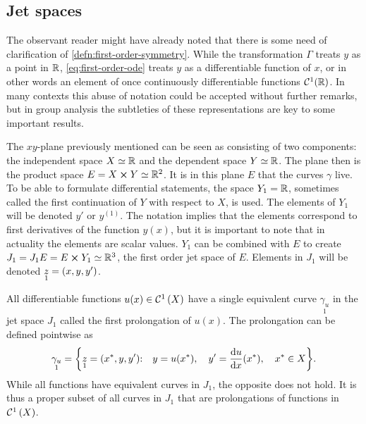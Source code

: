 \subsection{Jet spaces} \label{sec:jet-spaces}

The observant reader might have already noted that there is some need of clarification of \cref{defn:first-order-symmetry}.
While the transformation \(\Gamma\) treats \(y\) as a point in \(\mathbb{R}\), \cref{eq:first-order-ode} treats \(y\) as a differentiable function of \(x\), or in other words an element of once continuously differentiable functions \(\mathcal{C}^1(\mathbb{R})\).
In many contexts this abuse of notation could be accepted without further remarks, but in group analysis the subtleties of these representations are key to some important results.

The \(xy\)-plane previously mentioned can be seen as consisting of two components: the independent space \(X \simeq \mathbb{R}\) and the dependent space \(Y \simeq \mathbb{R}\).
The plane then is the product space \(E = X \cross Y \simeq \mathbb{R}^2\).
It is in this plane \(E\) that the curves \(\gamma\) live.
To be able to formulate differential statements, the space \(Y_1 = \mathbb{R}\), sometimes called the first continuation of \(Y\) with respect to \(X\), is used.
The elements of \(Y_1\) will be denoted \(y'\) or \(y^{(1)}\).
The notation implies that the elements correspond to first derivatives of the function \(y(x)\), but it is important to note that in actuality the elements are scalar values.
\(Y_1\) can be combined with \(E\) to create \(J_1 = J_1 E = E \cross Y_1 \simeq \mathbb{R}^3\), the first order jet space of \(E\).
Elements in \(J_1\) will be denoted \(\underset{1}{z} = \qty(x, y, y')\).

All differentiable functions \(u(x) \in \cont{1}{X}\) have a single equivalent curve \(\underset{1}{\gamma_u}\) in the jet space \(J_1\) called the first prolongation of \(u(x)\).
The prolongation can be defined pointwise as
\begin{equation}
  \underset{1}{\gamma_u} = \qty{\underset{1}{z} = \qty(\fixed{x}, y, y')\qq*{:} y = u(\fixed{x})\qc y' = \dv{u}{x}{(\fixed{x})}\qc \fixed{x} \in X}.
\end{equation}
While all functions have equivalent curves in \(J_1\), the opposite does not hold.
It is thus a proper subset of all curves in \(J_1\) that are prolongations of functions in \(\cont{1}{X}\).

